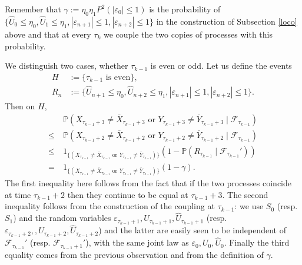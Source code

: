 \documentclass{article}
\begin{document}
Remember that $\gamma:=\eta_{0}\eta_{1}P^{2}(|\varepsilon_{0}|\leq 1)$ is the probability
of $\{\hat{U}_{0}\leq \eta_{0},\hat{U}_{1}\leq \eta_{1},|\varepsilon_{n+1}|\leq 1,|\varepsilon_{n+2}|\leq 1\}$
in the construction of Subsection \ref{loco} above and that at every $\tau_{k}$ we couple the two copies of processes with this probability.

We distinguish two cases, whether $\tau_{k-1}$ is even or odd. Let us define the events
\begin{align*}
H&:=\{\tau_{k-1}\mbox{ is even}\},\\
R_n &:=\{ \hat{U}_{n+1}\leq \eta_{0},\hat{U}_{n+2}\leq \eta_{1}, |\varepsilon_{n+1}|\leq 1,|\varepsilon_{n+2}|\leq 1\}.
\end{align*}
Then
on $H$,  
\begin{align}\nonumber
 & \mathbb{P}(X_{\tau_{k-1}+3}\neq\bar{X}_{\tau_{k-1}+3}\mbox{ or }Y_{\tau_{k-1}+3}
\neq\bar{Y}_{\tau_{k-1}+3}\mid\mathcal{F}_{\tau_{k-1}})\\
\leq~&\nonumber  \mathbb{P}(X_{\tau_{k-1}+2}\neq\bar{X}_{\tau_{k-1}+2}\mbox{ or }Y_{\tau_{k-1}+2}\neq\bar{Y}_{\tau_{k-1}+2}
\mid\mathcal{F}_{\tau_{k-1}})\\
\leq~&\nonumber 1_{\{
(X_{\tau_{k-1}}\neq\bar{X}_{\tau_{k-1}}\mbox{ or }Y_{\tau_{k-1}}\neq\bar{Y}_{\tau_{k-1}})\}}(1-\mathbb{P}(R_{\tau_{k-1}}\mid\mathcal{F}_{\tau_{k-1}}'))\\
=~& \label{olt1} 1_{\{
(X_{\tau_{k-1}}\neq\bar{X}_{\tau_{k-1}}\mbox{ or }Y_{\tau_{k-1}}\neq\bar{Y}_{\tau_{k-1}})\}}(1-\gamma).
\end{align}
The first inequality here follows from the fact that if the two processes coincide
at time $\tau_{k-1}+2$ then they continue to be equal at $\tau_{k-1}+3$. The second
inequality follows from the construction of the coupling at $\tau_{k-1}$: we use $S_{0}$ (resp. $S_{1}$) and the random variables 
$\varepsilon_{\tau_{k-1}+1},U_{\tau_{k-1}+1},\hat{U}_{\tau_{k-1}+1}$ (resp. $\varepsilon_{\tau_{k-1}+2},,U_{\tau_{k-1}+2},
\hat{U}_{\tau_{k-1}+2}$) and the latter are easily seen to be independent of $\mathcal{F}_{\tau_{k-1}}'$ 
(resp. $\mathcal{F}_{\tau_{k-1}+1}'$), with the same joint law as $\varepsilon_{0},U_{0},\hat{U}_{0}$. Finally
the third equality comes from the previous observation and from the definition of $\gamma$.{}
\end{document}
